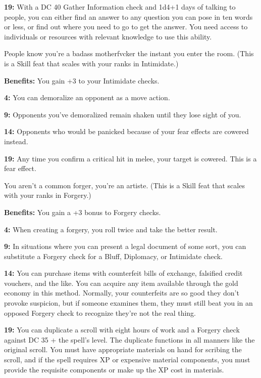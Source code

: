 \textbf{19:} With a DC 40 Gather Information check and 1d4+1 days of talking to people, you can either find an answer to any question you can pose in ten words or less, or find out where you need to go to get the answer. You need access to individuals or resources with relevant knowledge to use this ability.


People know you're a badass motherfvcker the instant you enter the room. (This is a Skill feat that scales with your ranks in Intimidate.)

\textbf{Benefits:} You gain +3 to your Intimidate checks.

\textbf{4:} You can demoralize an opponent as a move action.

\textbf{9:} Opponents you've demoralized remain shaken until they lose sight of you.

\textbf{14:} Opponents who would be panicked because of your fear effects are cowered instead.

\textbf{19:} Any time you confirm a critical hit in melee, your target is cowered. This is a fear effect.


You aren't a common forger, you're an artiste. (This is a Skill feat that scales with your ranks in Forgery.)

\textbf{Benefits:} You gain a +3 bonus to Forgery checks.

\textbf{4:} When creating a forgery, you roll twice and take the better result.

\textbf{9:} In situations where you can present a legal document of some sort, you can substitute a Forgery check for a Bluff, Diplomacy, or Intimidate check.

\textbf{14:} You can purchase items with counterfeit bills of exchange, falsified credit vouchers, and the like. You can acquire any item available through the gold economy in this method. Normally, your counterfeits are so good they don't provoke suspicion, but if someone examines them, they must still beat you in an opposed Forgery check to recognize they're not the real thing.

\textbf{19:} You can duplicate a scroll with eight hours of work and a Forgery check against DC 35 + the spell's level. The duplicate functions in all manners like the original scroll. You must have appropriate materials on hand for scribing the scroll, and if the spell requires XP or expensive material components, you must provide the requisite components or make up the XP cost in materials.

